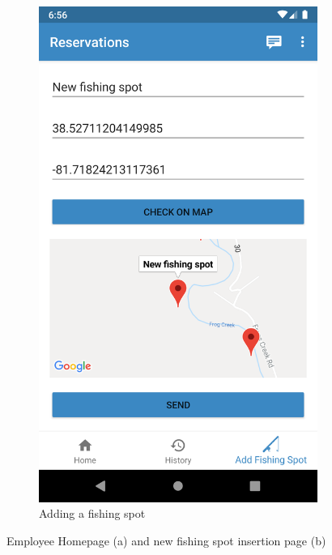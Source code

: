 \begin{figure}[h]
\begin{subfigure}{.5\textwidth}
  \includegraphics[height=.5\textheight, keepaspectratio=true]{Img/EmployeeSpot}
  \caption{Adding a fishing spot}
  \label{Fig:EmployeeSpot}
\end{subfigure}
  \caption{Employee Homepage (a) and new fishing spot insertion page (b)}
\end{figure}
